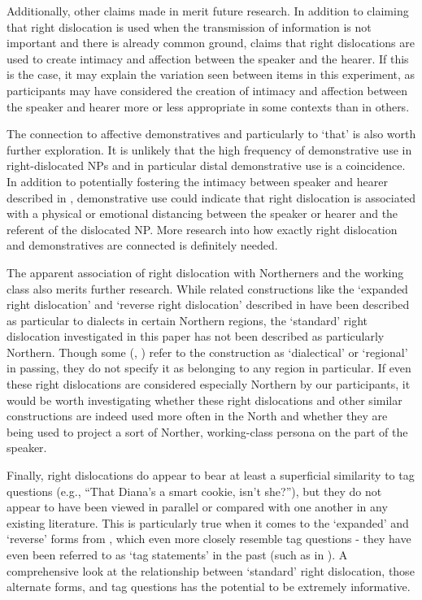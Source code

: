 \documentclass[titlepage,12pt]{article}
\begin{document}
Additionally, other claims made in \citealt{aijmer_themes_1989} merit future research. In addition to claiming that right dislocation is used when the transmission of information is not important and there is already common ground, \citeauthor{aijmer_themes_1989} claims that right dislocations are used to create intimacy and affection between the speaker and the hearer. If this is the case, it may explain the variation seen between items in this experiment, as participants may have considered the creation of intimacy and affection between the speaker and hearer more or less appropriate in some contexts than in others.

The connection to affective demonstratives and particularly to `that' is also worth further exploration. It is unlikely that the high frequency of demonstrative use in right-dislocated NPs and in particular distal demonstrative use is a coincidence. In addition to potentially fostering the intimacy between speaker and hearer described in \citealt{aijmer_themes_1989}, demonstrative use could indicate that right dislocation is associated with a physical or emotional distancing between the speaker or hearer and the referent of the dislocated NP. More research into how exactly right dislocation and demonstratives are connected is definitely needed.

The apparent association of right dislocation with Northerners and the working class also merits further research. While related constructions like the `expanded right dislocation' and `reverse right dislocation' described in \citealt{durham_right_2011} have been described as particular to dialects in certain Northern regions, the `standard' right dislocation investigated in this paper has not been described as particularly Northern. Though some (\citealt{visser_historical_1963}, \citealt{aijmer_themes_1989}) refer to the construction as `dialectical' or `regional' in passing, they do not specify it as belonging to any region in particular. If even these right dislocations are considered especially Northern by our participants, it would be worth investigating whether these right dislocations and other similar constructions are indeed used more often in the North and whether they are being used to project a sort of Norther, working-class persona on the part of the speaker.

Finally, right dislocations do appear to bear at least a superficial similarity to tag questions (e.g., ``That Diana's a smart cookie, isn't she?''), but they do not appear to have been viewed in parallel or compared with one another in any existing literature. This is particularly true when it comes to the `expanded' and `reverse' forms from \citealt{durham_right_2011}, which even more closely resemble tag questions - they have even been referred to as `tag statements' in the past (such as in \citealt{melchers_its_1983}). A comprehensive look at the relationship between `standard' right dislocation, those alternate forms, and tag questions has the potential to be extremely informative.
\end{document}
